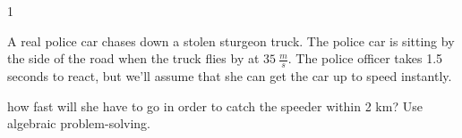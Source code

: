 
\AddToShipoutPicture*{\BackgroundPic}

\addtocounter {ProbNum} {1}

 
{\bf \Large{}}A real police car chases down a stolen sturgeon truck.  The police car is sitting by the side of the road when the truck flies by at ${35~\tfrac{m}{s}}$.  The police officer takes 1.5 seconds to react, but we'll assume that she can get the car up to speed instantly.


\bigskip
how fast will she have to go in order to catch the speeder within 2 km? Use algebraic problem-solving.
 
\vfill

\newpage